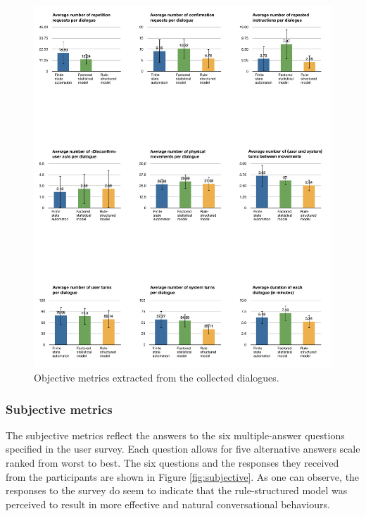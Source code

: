\begin{figure}[p]
\begin{center}
\includegraphics[scale=0.5]{imgs/objective.pdf}
\end{center} 
\caption{Objective metrics extracted from the collected dialogues. }
\label{fig:objective}
\end{figure}


\subsubsection*{Subjective metrics}

The subjective metrics reflect the answers to the six multiple-answer questions specified in the user survey. Each question allows for five alternative answers scale ranked from worst to best.  The six questions and the responses they received from the participants are shown in Figure \ref{fig:subjective}. As one can observe, the responses to the survey do seem to indicate that the rule-structured model was perceived to result in more effective and natural conversational behaviours. 


